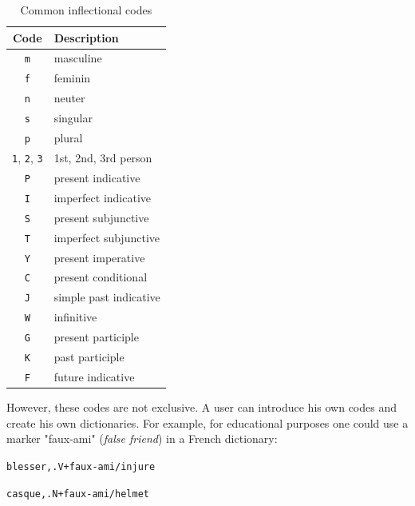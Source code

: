\begin{table}[!h]
\begin{center}
\begin{tabular}{|c|l|}
\hline
\textbf{Code} & \textbf{Description} \\
\hline
\verb+m+ & masculine \\
\hline
\verb+f+ & feminin \\
\hline
\verb+n+ & neuter \\
\hline
\verb+s+ & singular \\
\hline
\verb+p+ & plural \\
\hline
\verb+1+, \verb+2+, \verb+3+ & 1st, 2nd, 3rd person\\
\hline
\verb+P+ & present indicative \\
\hline
\verb+I+ & imperfect indicative  \\
\hline
\verb+S+ & present subjunctive \\
\hline
\verb+T+ & imperfect subjunctive  \\
\hline
\verb+Y+ & present imperative \\
\hline
\verb+C+ & present conditional \\
\hline
\verb+J+ & simple past indicative \\
\hline
\verb+W+ & infinitive \\
\hline
\verb+G+ & present participle \\
\hline
\verb+K+ & past participle \\
\hline
\verb+F+ & future indicative \\
\hline
\end{tabular}
\caption{Common inflectional codes\label{tab-inflectional-codes}}
\end{center}
\end{table}

\bigskip
\noindent However, these codes are not exclusive. A user can introduce his own codes
and create his own dictionaries. For example, for educational purposes one could
use a marker "faux-ami" (\textit{false friend}) in a French dictionary:

\bigskip
\noindent
\texttt{blesser,.V+faux-ami/injure}

\noindent
\texttt{casque,.N+faux-ami/helmet}

